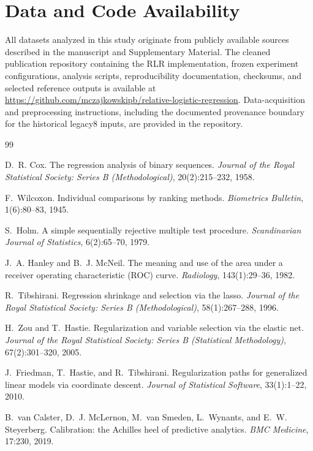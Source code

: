 \documentclass[journal]{IEEEtran}
\begin{document}
\section*{Data and Code Availability}

All datasets analyzed in this study originate from publicly available sources described in the manuscript and Supplementary Material. The cleaned publication repository containing the RLR implementation, frozen experiment configurations, analysis scripts, reproducibility documentation, checksums, and selected reference outputs is available at \url{https://github.com/mczajkowskipb/relative-logistic-regression}. Data-acquisition and preprocessing instructions, including the documented provenance boundary for the historical legacy8 inputs, are provided in the repository.
\begin{thebibliography}{99}

D.~R. Cox.
\newblock The regression analysis of binary sequences.
\newblock \emph{Journal of the Royal Statistical Society: Series B (Methodological)}, 20(2):215--232, 1958.

F.~Wilcoxon.
\newblock Individual comparisons by ranking methods.
\newblock \emph{Biometrics Bulletin}, 1(6):80--83, 1945.

S.~Holm.
\newblock A simple sequentially rejective multiple test procedure.
\newblock \emph{Scandinavian Journal of Statistics}, 6(2):65--70, 1979.

J.~A. Hanley and B.~J. McNeil.
\newblock The meaning and use of the area under a receiver operating characteristic (ROC) curve.
\newblock \emph{Radiology}, 143(1):29--36, 1982.

R.~Tibshirani.
\newblock Regression shrinkage and selection via the lasso.
\newblock \emph{Journal of the Royal Statistical Society: Series B (Methodological)}, 58(1):267--288, 1996.

H.~Zou and T.~Hastie.
\newblock Regularization and variable selection via the elastic net.
\newblock \emph{Journal of the Royal Statistical Society: Series B (Statistical Methodology)}, 67(2):301--320, 2005.

J.~Friedman, T.~Hastie, and R.~Tibshirani.
\newblock Regularization paths for generalized linear models via coordinate descent.
\newblock \emph{Journal of Statistical Software}, 33(1):1--22, 2010.

B.~van Calster, D.~J. McLernon, M.~van Smeden, L.~Wynants, and E.~W. Steyerberg.
\newblock Calibration: the Achilles heel of predictive analytics.
\newblock \emph{BMC Medicine}, 17:230, 2019.


\end{thebibliography}
\end{document}
